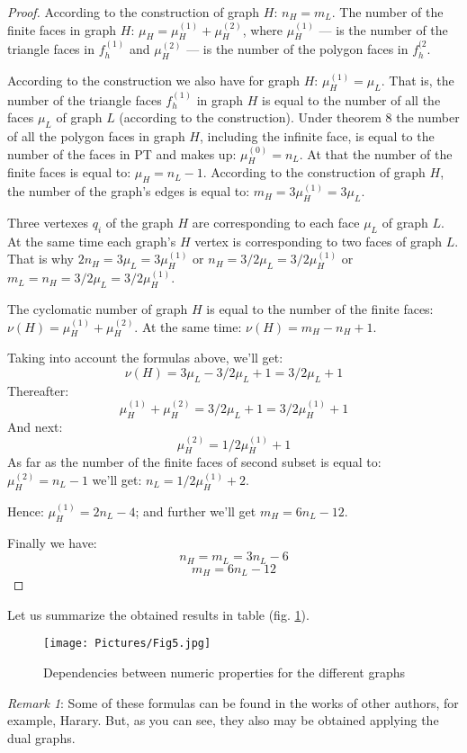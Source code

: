 \documentclass{amsart}
\theoremstyle{plain}
\numberwithin{equation}{section}
\begin{document}
\begin{proof}
According to the construction of graph $H$: $n_H=m_L$. The number of the finite faces in graph $H$: $\mu_H=\mu_H^{(1)}+\mu_H^{(2)}$, where $\mu_H^{(1)}$ --- is the number of the triangle faces in $f_h^{(1)}$ and $\mu_H^{(2)}$ --- is the number of the polygon faces in $f_h^{(2}$.

According to the construction we also have for graph $H$: $\mu_H^{(1)}=\mu_L$. That is, the number of the triangle faces $f_h^{(1)}$ in graph $H$ is equal to the number of all the faces $\mu_L$ of graph $L$ (according to the construction). Under theorem 8 the number of all the polygon faces in graph $H$, including the infinite face, is equal to the number of the faces in PT and makes up: $\mu_H^{(0)}=n_L$. At that the number of the finite faces is equal to: $\mu_H=n_L-1$. According to the construction of graph $H$, the number of the graph's edges is equal to: $m_H=3\mu_H^{(1)}=3\mu_L$.

Three vertexes $q_i$ of the graph $H$ are corresponding to each face $\mu_L$ of graph $L$. At the same time each graph's $H$ vertex is corresponding to two faces of graph $L$. That is why $2n_H=3\mu_L=3\mu_H^{(1)}$ or $n_H=3/2 \mu_L=3/2 \mu_H^{(1)}$ or $m_L=n_H=3/2 \mu_L=3/2 \mu_H^{(1)}$.

The cyclomatic number of graph $H$ is equal to the number of the finite faces: $\nu(H)=\mu_H^{(1)}+\mu_H^{(2)}$. At the same time: $\nu(H)=m_H-n_H+1$.

Taking into account the formulas above, we'll get:
$$\nu(H)=3\mu_L-3/2 \mu_L+1=3/2 \mu_L+1$$
Thereafter: 
$$\mu_H^{(1)}+\mu_H^{(2)}=3/2 \mu_L+1=3/2 \mu_H^{(1)}+1$$
And next: 
$$\mu_H^{(2)}=1/2 \mu_H^{(1)}+1$$
As far as the number of the finite faces of second subset is equal to: $\mu_H^{(2)}=n_L-1$ we'll get: $n_L=1/2 \mu_H^{(1)}+2$. 

Hence: $\mu_H^{(1)}=2n_L-4$; and further we'll get $m_H=6n_L-12$. 

Finally we have: 
$$n_H=m_L=3n_L-6$$ 
$$m_H=6n_L-12$$
\end{proof}

Let us summarize the obtained results in table (fig. \ref{Fig:5}). 

\begin{figure}[htb]
		\texttt{[image: Pictures/Fig5.jpg]}
	\caption{Dependencies between numeric properties for the different graphs}
	\label{Fig:5}
\end{figure}

\textit{Remark 1}: Some of these formulas can be found in the works of other authors, for example, Harary. But, as you can see, they also may be obtained applying the dual graphs.
\end{document}
